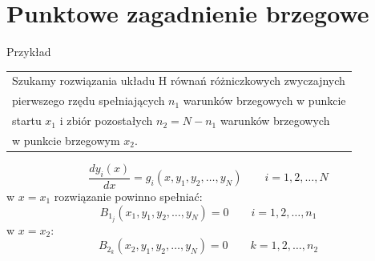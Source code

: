 \section{Punktowe zagadnienie brzegowe}
\begin{frame}{Przykład}
	\begin{tabular}{|l}
	Szukamy rozwiązania układu H równań różniczkowych zwyczajnych \\
    pierwszego rzędu spełniających $n_1$ warunków brzegowych w punkcie \\
    startu $x_1$ i zbiór pozostałych $n_2 = N-n_1$ warunków brzegowych \\
    w punkcie brzegowym $x_2$.
	\end{tabular}
    $$\frac{dy_i(x)}{dx}= g_i(x, y_1, y_2,\ldots, y_N)\qquad i = 1,2, \ldots, N$$
	w $x = x_1$ rozwiązanie powinno spełniać: \newline
    $$B_{1_j}(x_1, y_1, y_2,\ldots, y_N) = 0\qquad i = 1,2, \ldots, n_1 $$
	w $x = x_2$:
    $$B_{2_k}(x_2, y_1, y_2,\ldots, y_N) = 0 \qquad k = 1,2, \ldots, n_2 $$
\end{frame}
